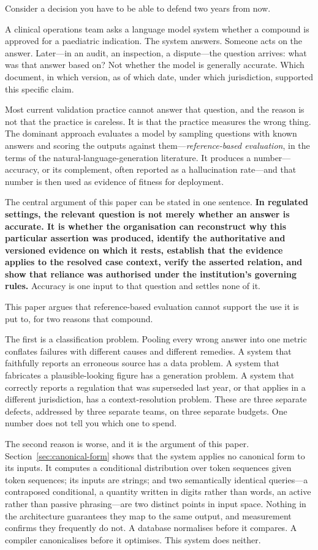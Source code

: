 \documentclass[11pt]{article}
\theoremstyle{plain}
\theoremstyle{definition}
\begin{document}
Consider a decision you have to be able to defend two years from now.

A clinical operations team asks a language model system whether a compound is
approved for a paediatric indication. The system answers. Someone acts on the
answer. Later---in an audit, an inspection, a dispute---the question arrives:
what was that answer based on? Not whether the model is generally accurate. Which
document, in which version, as of which date, under which jurisdiction, supported
this specific claim.

Most current validation practice cannot answer that question, and the reason is
not that the practice is careless. It is that the practice measures the wrong
thing. The dominant approach evaluates a model by sampling questions with known
answers and scoring the outputs against them---\emph{reference-based evaluation},
in the terms of the natural-language-generation literature. It produces a
number---accuracy, or its complement, often reported as a hallucination
rate---and that number is then used as evidence of fitness for deployment.

The central argument of this paper can be stated in one sentence. \textbf{In
regulated settings, the relevant question is not merely whether an answer is
accurate. It is whether the organisation can reconstruct why this particular
assertion was produced, identify the authoritative and versioned evidence on which
it rests, establish that the evidence applies to the resolved case context, verify
the asserted relation, and show that reliance was authorised under the institution's
governing rules.} Accuracy is one input to that question and settles none of it.

This paper argues that reference-based evaluation cannot support the use it is put
to,
for two reasons that compound.

The first is a classification problem. Pooling every wrong answer into one
metric conflates failures with different causes and different remedies. A system
that faithfully reports an erroneous source has a data problem. A system that
fabricates a plausible-looking figure has a generation problem. A system that
correctly reports a regulation that was superseded last year, or that applies in
a different jurisdiction, has a context-resolution problem. These are three
separate defects, addressed by three separate teams, on three separate budgets.
One number does not tell you which one to spend.

The second reason is worse, and it is the argument of this paper.
Section~\ref{sec:canonical-form} shows that the system applies no canonical form
to its inputs. It computes a conditional distribution over token sequences given
token sequences; its inputs are strings; and two semantically identical
queries---a contraposed conditional, a quantity written in digits rather than
words, an active rather than passive phrasing---are two distinct points in input
space. Nothing in the architecture guarantees they map to the same output, and
measurement confirms they frequently do not. A database normalises before it
compares. A compiler canonicalises before it optimises. This system does
neither.
\end{document}
